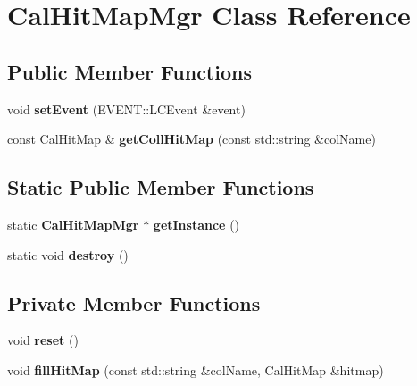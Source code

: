 \section{Cal\-Hit\-Map\-Mgr Class Reference}
\label{classCalHitMapMgr}
\subsection*{Public Member Functions}
\begin{DoxyCompactItemize}
\item 
void {\bfseries set\-Event} (E\-V\-E\-N\-T\-::\-L\-C\-Event \&event)\label{classCalHitMapMgr_ad3aaa8d5ae1478e9f52f05f209488fb3}

\item 
const Cal\-Hit\-Map \& {\bfseries get\-Coll\-Hit\-Map} (const std\-::string \&col\-Name)\label{classCalHitMapMgr_ae2a074496237dafdce69548f286369ae}

\end{DoxyCompactItemize}
\subsection*{Static Public Member Functions}
\begin{DoxyCompactItemize}
\item 
static {\bf Cal\-Hit\-Map\-Mgr} $\ast$ {\bfseries get\-Instance} ()\label{classCalHitMapMgr_a874f784c6a758bd9955da367d360edbc}

\item 
static void {\bfseries destroy} ()\label{classCalHitMapMgr_a7594e4c6027470927b332aa640e5d691}

\end{DoxyCompactItemize}
\subsection*{Private Member Functions}
\begin{DoxyCompactItemize}
\item 
void {\bfseries reset} ()\label{classCalHitMapMgr_a21bcf7abf7542fd01dcaec0db7479d9c}

\item 
void {\bfseries fill\-Hit\-Map} (const std\-::string \&col\-Name, Cal\-Hit\-Map \&hitmap)\label{classCalHitMapMgr_a60d1d1557559b96ad5ccbdf445c261f4}

\end{DoxyCompactItemize}
